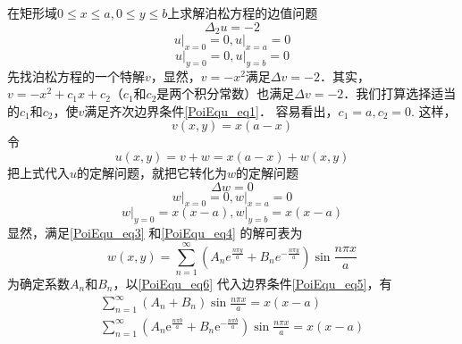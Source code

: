 \begin{example}{}
    在矩形域$0\leq x\leq a, 0\leq y\leq b$上求解泊松方程的边值问题
    \begin{equation}
        \Delta_{2} u=-2
    \end{equation}
    \begin{equation} \label{PoiEqu_eq1}
        \left.u\right|_{x=0}=0,\left.u\right|_{x=a}=0
    \end{equation}
    \begin{equation}\label{PoiEqu_eq2}
        \left.u\right|_{y=0}=0,\left.u\right|_{y=b}=0
    \end{equation}
    先找泊松方程的一个特解$v$，显然，$v=-x^2$满足$\Delta v =-2$．其实，$v=-x^2+c_1x+c_2$（$c_1$和$c_2$是两个积分常数）也满足$\Delta v = -2$．我们打算选择适当的$c_1$和$c_2$，使$v$满足齐次边界条件\autoref{PoiEqu_eq1}． 容易看出，$c_1=a,c_2 = 0$.
    这样，
    \begin{equation}
        v(x,y) = x(a-x)
    \end{equation}
    令
    \begin{equation}
        u(x,y)=v+w=x(a-x)+w(x,y)
    \end{equation}
    把上式代入$u$的定解问题，就把它转化为$w $的定解问题
    \begin{equation} \label{PoiEqu_eq3}
        \Delta w =0
    \end{equation}
    \begin{equation} \label{PoiEqu_eq4}
        \left.w\right|_{x=0}=0,\left.w\right|_{x=a}=0
    \end{equation}
    \begin{equation} \label{PoiEqu_eq5}
        \left.w\right|_{y=0}=x(x-a),\left.w\right|_{y=b}=x(x-a)
    \end{equation}
    显然，满足\autoref{PoiEqu_eq3} 和\autoref{PoiEqu_eq4} 的解可表为
    \begin{equation} \label{PoiEqu_eq6}
        w(x, y)=\sum_{n=1}^{\infty}\left(A_{n} e^{\frac{n \pi y}{a}}+B_{n} e^{-\frac{n \pi y}{a}}\right) \sin \frac{n \pi x}{a}
    \end{equation}
    为确定系数$A_n$和$B_n$，以\autoref{PoiEqu_eq6} 代入边界条件\autoref{PoiEqu_eq5}，有
    \begin{equation}  \label{PoiEqu_eq7}
        \begin{array}{l}\sum_{n=1}^{\infty}\left(A_{n}+B_{n}\right) \sin \frac{n \pi x}{a}=x(x-a) \\ \sum_{n=1}^{\infty}\left(A_{n} \mathrm{e}^{\frac{n \pi b}{a}}+B_{n} \mathrm{e}^{-\frac{n \pi b}{a}}\right) \sin \frac{n \pi x}{a}=x(x-a)\end{array}

\end{equation}
\end{example}
